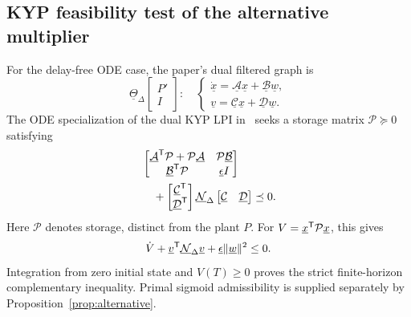 \subsection{KYP feasibility test of the alternative multiplier}
For the delay-free ODE case, the paper's dual filtered graph is
\begin{equation*}
 \underline\Theta_\Delta\begin{bmatrix}P'\\I\end{bmatrix}:
 \quad\begin{cases}
 \dot{\underline x}=\underline{\mathcal A}\underline x+\underline{\mathcal B}\underline w,\\
 \underline v=\underline{\mathcal C}\underline x+\underline{\mathcal D}\underline w.
 \end{cases}
\end{equation*}
The ODE specialization of the dual KYP LPI in~\cite[Section VII.B]{dualPIE} seeks a storage matrix $\mathcal P\succeq0$ satisfying
\begin{equation}\label{eq:alternativekyp}
\begin{aligned}
 &\begin{bmatrix}
 \underline{\mathcal A}^{\mathsf{T}}\mathcal P+\mathcal P\underline{\mathcal A}
 &\mathcal P\underline{\mathcal B}\\
 \underline{\mathcal B}^{\mathsf{T}}\mathcal P&\underline\epsilon I
 \end{bmatrix}\\
 &\quad+\begin{bmatrix}\underline{\mathcal C}^{\mathsf{T}}\\\underline{\mathcal D}^{\mathsf{T}}\end{bmatrix}
 \underline{\mathcal N}_\Delta
 \begin{bmatrix}\underline{\mathcal C}&\underline{\mathcal D}\end{bmatrix}
 \preceq0.
\end{aligned}
\end{equation}
Here $\mathcal P$ denotes storage, distinct from the plant $P$. For $V=\underline x^{\mathsf{T}}\mathcal P\underline x$, this gives
\begin{equation*}
 \dot V+\underline v^{\mathsf{T}}\underline{\mathcal N}_\Delta\underline v
 +\underline\epsilon\|\underline w\|^2\le0.
\end{equation*}
Integration from zero initial state and $V(T)\ge0$ proves the strict finite-horizon complementary inequality. Primal sigmoid admissibility is supplied separately by Proposition~\ref{prop:alternative}.

